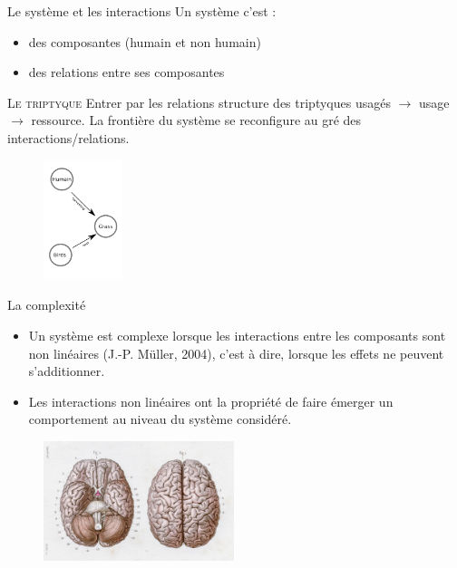\documentclass[newPxFont]{beamer}
\begin{document}
\begin{frame}[c]{Le système et les interactions}
\vspace{-1cm}
Un système c'est :
\begin{itemize}
  \item des composantes (humain et non humain)
  \item des relations entre ses composantes
\end{itemize}

\small{
  \begin{alertblock}{\textsc{Le triptyque}}
      Entrer par les relations structure des triptyques usagés $\rightarrow$ usage $\rightarrow$ ressource. La frontière du système se reconfigure au gré des interactions/relations.
  \end{alertblock}
}
\begin{figure}
  \includegraphics[height=3.5cm]{img/ReHab_network.png}
\end{figure}

\end{frame}


\begin{frame}[c]{La complexité}
\vspace{-1cm}
\begin{itemize}
  \item Un système est complexe lorsque les interactions entre les composants sont non linéaires (J.-P. Müller, 2004), c'est à dire,  lorsque les effets ne peuvent s’additionner.
  \item Les interactions non linéaires ont la propriété de faire émerger un comportement au niveau du système considéré.
\end{itemize}


\begin{figure}
  \includegraphics[height=3.5cm]{img/anatomical-illustration-of-the-human-brain.jpg}
\end{figure}
\end{frame}
\end{document}
